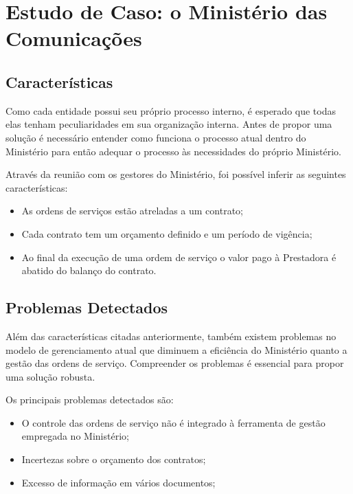 \section{Estudo de Caso: o Ministério das Comunicações}

\subsection{Características}

Como cada entidade possui seu próprio processo interno, é esperado que todas
elas tenham peculiaridades em sua organização interna. Antes de propor uma solução
é necessário entender como funciona o processo atual dentro do Ministério para
então adequar o processo às necessidades do próprio Ministério.

Através da reunião com os gestores do Ministério, foi possível inferir as
seguintes características:

\begin{itemize}
  \item As ordens de serviços estão atreladas a um contrato;
  \item Cada contrato tem um orçamento definido e um período de vigência;
  \item Ao final da execução de uma ordem de serviço o valor pago à Prestadora
  é abatido do balanço do contrato.
\end{itemize}

\subsection{Problemas Detectados}

Além das características citadas anteriormente, também existem problemas no
modelo de gerenciamento atual que diminuem a eficiência do Ministério quanto
a gestão das ordens de serviço. Compreender os problemas é essencial para propor
uma solução robusta.

Os principais problemas detectados são:

\begin{itemize}
  \item O controle das ordens de serviço não é integrado à ferramenta de gestão
  empregada no Ministério;
  \item Incertezas sobre o orçamento dos contratos;
  \item Excesso de informação em vários documentos;
\end{itemize}
